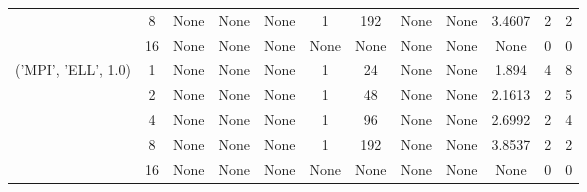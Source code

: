 \begin{tabular}{cccccccccccc}
& 8& None& None& None& 1& 192& None& None& 3.4607& 2& 2\\
& 16& None& None& None& None& None& None& None& None& 0& 0\\
\hline
\multirow{5}{*}{('MPI', 'ELL', 1.0)}& 1& None& None& None& 1& 24& None& None& 1.894& 4& 8\\
& 2& None& None& None& 1& 48& None& None& 2.1613& 2& 5\\
& 4& None& None& None& 1& 96& None& None& 2.6992& 2& 4\\
& 8& None& None& None& 1& 192& None& None& 3.8537& 2& 2\\
& 16& None& None& None& None& None& None& None& None& 0& 0\\
\hline
\end{tabular}
